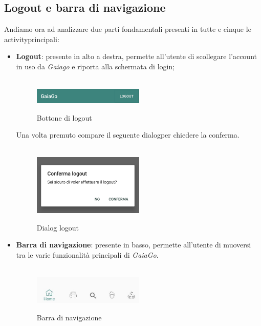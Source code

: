 \subsection{Logout e barra di navigazione}
Andiamo ora ad analizzare due parti fondamentali presenti in tutte e cinque le activity\glosp principali:
\begin{itemize}
	\item \textbf{Logout}: presente in alto a destra, permette all'utente di scollegare l'account in uso da \textit{Gaiago} e riporta alla schermata di login;
	\\\\
	  \begin{figure}[H] 
	 	\centering 
	 	\includegraphics[width=0.5\textwidth]{res/images/logout.png}\\
	 	\caption{Bottone di logout}
	 	\label{Login button}
	 \end{figure}
 Una volta premuto compare il seguente dialog\glosp per chiedere la conferma.
 \\\\
 \begin{figure}[H] 
 	\centering 
 	\includegraphics[width=0.5\textwidth]{res/images/logout_press.png}\\
 	\caption{Dialog logout}
 	\label{Logout_press}
 \end{figure}
 	\item  \textbf{Barra di navigazione}: presente in basso, permette all'utente di muoversi tra le varie funzionalità principali di \textit{GaiaGo}.
 	\\\\
 	  \begin{figure}[H] 
 	  	\centering 
 	  	\includegraphics[width=0.5\textwidth]{res/images/barra_navigazione.jpg}\\
 	  	\caption{Barra di navigazione}
 	  	\label{Barra di navigazione}
 	  \end{figure}
\end{itemize}
\pagebreak
